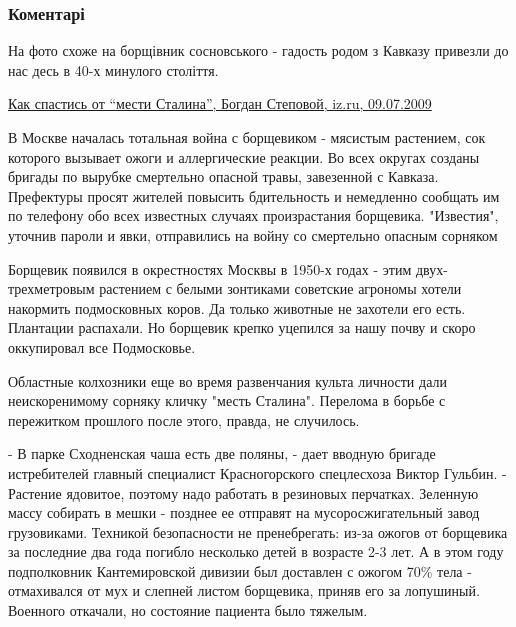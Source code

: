  
 
 
 
 
\subsubsection{Коментарі}

\begin{itemize} %


На фото схоже на борщівник сосновського - гадость родом з Кавказу привезли до
нас десь в 40-х минулого століття.

\href{https://iz.ru/news/350529}{%
Как спастись от \enquote{мести Сталина}, Богдан Степовой, iz.ru, 09.07.2009%
}

\begin{multicols}{2}
В Москве началась тотальная война с борщевиком - мясистым растением, сок
которого вызывает ожоги и аллергические реакции. Во всех округах созданы
бригады по вырубке смертельно опасной травы, завезенной с Кавказа. Префектуры
просят жителей повысить бдительность и немедленно сообщать им по телефону обо
всех известных случаях произрастания борщевика. "Известия", уточнив пароли и
явки, отправились на войну со смертельно опасным сорняком

Борщевик появился в окрестностях Москвы в 1950-х годах - этим двух-трехметровым
растением с белыми зонтиками советские агрономы хотели накормить подмосковных
коров. Да только животные не захотели его есть. Плантации распахали. Но
борщевик крепко уцепился за нашу почву и скоро оккупировал все Подмосковье.

Областные колхозники еще во время развенчания культа личности дали
неискоренимому сорняку кличку "месть Сталина". Перелома в борьбе с пережитком
прошлого после этого, правда, не случилось.

- В парке Сходненская чаша есть две поляны, - дает вводную бригаде истребителей
главный специалист Красногорского спецлесхоза Виктор Гульбин. - Растение
ядовитое, поэтому надо работать в резиновых перчатках. Зеленную массу собирать
в мешки - позднее ее отправят на мусоросжигательный завод грузовиками. Техникой
безопасности не пренебрегать: из-за ожогов от борщевика за последние два года
погибло несколько детей в возрасте 2-3 лет. А в этом году подполковник
Кантемировской дивизии был доставлен с ожогом 70\% тела - отмахивался от мух и
слепней листом борщевика, приняв его за лопушиный. Военного откачали, но
состояние пациента было тяжелым.


\end{multicols}
\end{itemize}
